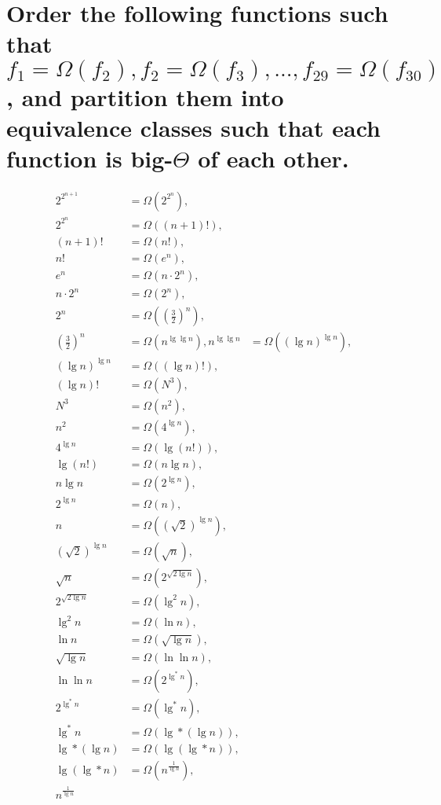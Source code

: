 \section[Problem 6]{Order the following functions such that $f_1 = \Omega(f_2), f_2 = \Omega(f_3), ..., f_{29} = \Omega(f_{30})$, and partition them into equivalence classes such that each function is big-$\Theta$ of each other.}

\begin{align*}
	2^{2^{n + 1}} &= \Omega(2^{2^n}), \\
	2^{2^n} &= \Omega((n + 1)!), \\
	(n + 1)! &= \Omega(n!), \\
	n! &= \Omega(e^n), \\
	e^n &= \Omega(n \cdot 2^n), \\
	n \cdot 2^n &= \Omega(2^n), \\
	2^n &= \Omega(\left( \frac{3}{2} \right)^n), \\
	\left( \frac{3}{2} \right)^n &= \Omega(n^{\lg \lg n}), n^{\lg \lg n} &= \Omega(\left( \lg n \right)^{\lg n}), \\
	\left( \lg n \right)^{\lg n} &= \Omega((\lg n)!), \\
	(\lg n)! &= \Omega(N^3), \\
	N^3 &= \Omega(n^2), \\
	n^2 &= \Omega(4^{\lg n}), \\
	4^{\lg n} &= \Omega(\lg (n!)), \\
	\lg (n!) &= \Omega(n \lg n), \\
	n \lg n &= \Omega(2^{\lg n}), \\
	2^{\lg n} &= \Omega(n), \\
	n &= \Omega(\left( \sqrt{2} \right)^{\lg n}), \\
	\left( \sqrt{2} \right)^{\lg n} &= \Omega(\sqrt{n}), \\
	\sqrt{n} &= \Omega(2^{\sqrt{2 \lg n}}), \\
	2^{\sqrt{2 \lg n}} &= \Omega(\lg ^2 n), \\
	\lg ^2 n &= \Omega(\ln n), \\
	\ln n &= \Omega(\sqrt{\lg n}), \\
	\sqrt{\lg n} &= \Omega(\ln \ln n), \\
	\ln \ln n &= \Omega(2^{\lg ^* n}), \\
	2^{\lg ^* n} &= \Omega(\lg ^* n), \\
	\lg ^* n &= \Omega(\lg * (\lg n)), \\
	\lg * (\lg n) &= \Omega(\lg (\lg * n)), \\
	\lg (\lg * n) &= \Omega(n^{\frac{1}{\lg n}}), \\
	n^{\frac{1}{\lg n}}
\end{align*}
